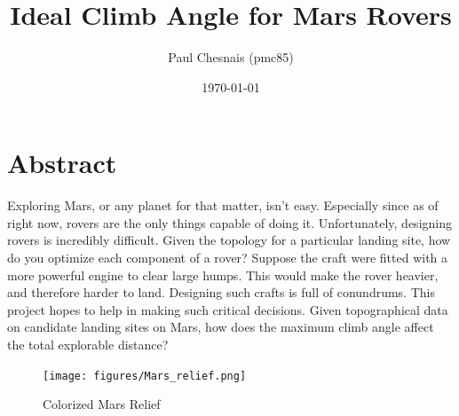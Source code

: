\documentclass[12pt, twocolumn]{article}
\title{Ideal Climb Angle for Mars Rovers}
\author{Paul Chesnais (pmc85)}
\date{\today}
\begin{document}
\maketitle
\thispagestyle{empty}

\section{Abstract}
\label{sec:abstract}
Exploring Mars, or any planet for that matter, isn't easy. Especially since as of right now, rovers are the only things capable of doing it. Unfortunately, designing rovers is incredibly difficult. Given the topology for a particular landing site, how do you optimize each component of a rover? Suppose the craft were fitted with a more powerful engine to clear large humps. This would make the rover heavier, and therefore harder to land. Designing such crafts is full of conundrums. This project hopes to help in making such critical decisions. Given topographical data on candidate landing sites on Mars, how does the maximum climb angle affect the total explorable distance?

\begin{figure}
  \texttt{[image: figures/Mars\_relief.png]}
  \caption{Colorized Mars Relief}
  \label{fig:mola}
\end{figure}
\end{document}
